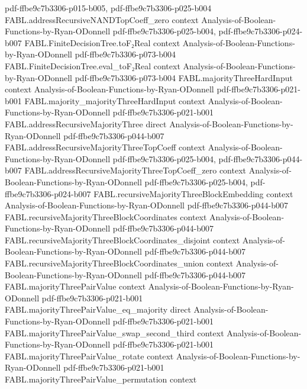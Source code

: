 \begin{theorem}
  {pdf-ffbe9c7b3306-p015-b005,
    pdf-ffbe9c7b3306-p025-b004}
\proofstep
  {FABL.addressRecursiveNANDTopCoeff_zero}
  {context}
  {Analysis-of-Boolean-Functions-by-Ryan-ODonnell}
  {pdf-ffbe9c7b3306-p025-b004,
    pdf-ffbe9c7b3306-p024-b007}
\proofstep
  {FABL.FiniteDecisionTree.toF₂Real}
  {context}
  {Analysis-of-Boolean-Functions-by-Ryan-ODonnell}
  {pdf-ffbe9c7b3306-p073-b004}
\proofstep
  {FABL.FiniteDecisionTree.eval_toF₂Real}
  {context}
  {Analysis-of-Boolean-Functions-by-Ryan-ODonnell}
  {pdf-ffbe9c7b3306-p073-b004}
\proofstep
  {FABL.majorityThreeHardInput}
  {context}
  {Analysis-of-Boolean-Functions-by-Ryan-ODonnell}
  {pdf-ffbe9c7b3306-p021-b001}
\proofstep
  {FABL.majority_majorityThreeHardInput}
  {context}
  {Analysis-of-Boolean-Functions-by-Ryan-ODonnell}
  {pdf-ffbe9c7b3306-p021-b001}
\proofstep
  {FABL.addressRecursiveMajorityThree}
  {direct}
  {Analysis-of-Boolean-Functions-by-Ryan-ODonnell}
  {pdf-ffbe9c7b3306-p044-b007}
\proofstep
  {FABL.addressRecursiveMajorityThreeTopCoeff}
  {context}
  {Analysis-of-Boolean-Functions-by-Ryan-ODonnell}
  {pdf-ffbe9c7b3306-p025-b004,
    pdf-ffbe9c7b3306-p044-b007}
\proofstep
  {FABL.addressRecursiveMajorityThreeTopCoeff_zero}
  {context}
  {Analysis-of-Boolean-Functions-by-Ryan-ODonnell}
  {pdf-ffbe9c7b3306-p025-b004,
    pdf-ffbe9c7b3306-p024-b007}
\proofstep
  {FABL.recursiveMajorityThreeBlockEmbedding}
  {context}
  {Analysis-of-Boolean-Functions-by-Ryan-ODonnell}
  {pdf-ffbe9c7b3306-p044-b007}
\proofstep
  {FABL.recursiveMajorityThreeBlockCoordinates}
  {context}
  {Analysis-of-Boolean-Functions-by-Ryan-ODonnell}
  {pdf-ffbe9c7b3306-p044-b007}
\proofstep
  {FABL.recursiveMajorityThreeBlockCoordinates_disjoint}
  {context}
  {Analysis-of-Boolean-Functions-by-Ryan-ODonnell}
  {pdf-ffbe9c7b3306-p044-b007}
\proofstep
  {FABL.recursiveMajorityThreeBlockCoordinates_union}
  {context}
  {Analysis-of-Boolean-Functions-by-Ryan-ODonnell}
  {pdf-ffbe9c7b3306-p044-b007}
\proofstep
  {FABL.majorityThreePairValue}
  {context}
  {Analysis-of-Boolean-Functions-by-Ryan-ODonnell}
  {pdf-ffbe9c7b3306-p021-b001}
\proofstep
  {FABL.majorityThreePairValue_eq_majority}
  {direct}
  {Analysis-of-Boolean-Functions-by-Ryan-ODonnell}
  {pdf-ffbe9c7b3306-p021-b001}
\proofstep
  {FABL.majorityThreePairValue_swap_second_third}
  {context}
  {Analysis-of-Boolean-Functions-by-Ryan-ODonnell}
  {pdf-ffbe9c7b3306-p021-b001}
\proofstep
  {FABL.majorityThreePairValue_rotate}
  {context}
  {Analysis-of-Boolean-Functions-by-Ryan-ODonnell}
  {pdf-ffbe9c7b3306-p021-b001}
\proofstep
  {FABL.majorityThreePairValue_permutation}
  {context}

\end{theorem}
